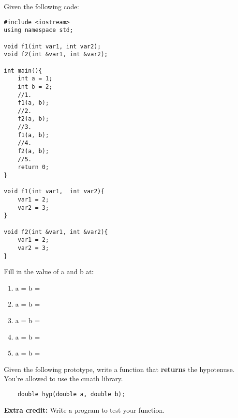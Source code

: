 \documentclass[addpoints,12pt]{exam}
\begin{document}

\begin{center}
\end{center}
\vspace{0.1in}
\begin{center}
\gradetable[h][questions]
\end{center}

\begin{questions}
\question [5] Given the following code:
\begin{multicols}{2}
\begin{lstlisting}
#include <iostream>
using namespace std;

void f1(int var1, int var2);
void f2(int &var1, int &var2);

int main(){
	int a = 1;
	int b = 2;
	//1.
	f1(a, b);
	//2. 
	f2(a, b);
	//3. 
	f1(a, b);
	//4. 
	f2(a, b);
	//5.
	return 0;
}

void f1(int var1,  int var2){
	var1 = 2;
	var2 = 3;
}

void f2(int &var1, int &var2){
	var1 = 2;
	var2 = 3;
}

\end{lstlisting}
\columnbreak
Fill in the value of a and b at:
	\begin{enumerate}
		\item a = \underline{\hspace{1cm}} b = \underline{\hspace{1cm}}    
		\item a = \underline{\hspace{1cm}} b = \underline{\hspace{1cm}}
		\item a = \underline{\hspace{1cm}} b = \underline{\hspace{1cm}}   
		\item a = \underline{\hspace{1cm}} b = \underline{\hspace{1cm}}   
		\item a = \underline{\hspace{1cm}} b = \underline{\hspace{1cm}}   
	\end{enumerate}   
\end{multicols}
\question [5]
Given the following prototype, write a function that \textbf{returns} the hypotenuse. You're allowed to use the cmath library.
\begin{lstlisting}
	double hyp(double a, double b);
\end{lstlisting}
 \textbf{Extra credit:} Write a program to test your function. 
\end{questions}
\end{document}
